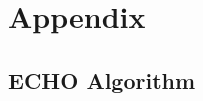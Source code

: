 \documentclass{article}
\begin{document}






\appendix

\section{Appendix}

\subsection{ECHO Algorithm}\label{appendix:echo_algorithm}
\end{document}
